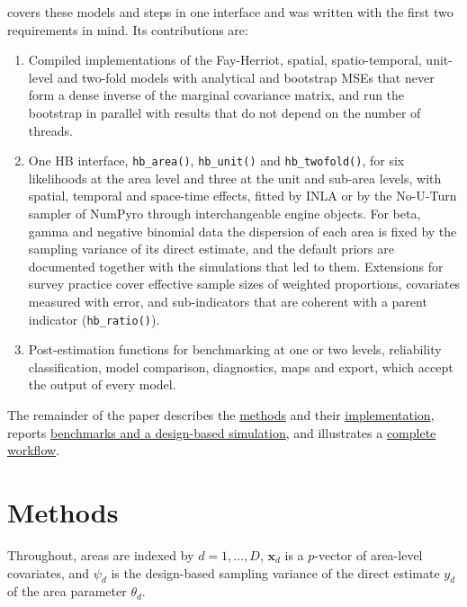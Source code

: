  covers these models and steps in one interface and was written with the first two requirements in mind. Its contributions are:

\begin{enumerate}
\def\labelenumi{\arabic{enumi}.}
\tightlist
\item
  Compiled implementations of the Fay-Herriot, spatial, spatio-temporal, unit-level and two-fold models with analytical and bootstrap MSEs that never form a dense inverse of the marginal covariance matrix, and run the bootstrap in parallel with results that do not depend on the number of threads.
\item
  One HB interface, \texttt{hb\_area()}, \texttt{hb\_unit()} and \texttt{hb\_twofold()}, for six likelihoods at the area level and three at the unit and sub-area levels, with spatial, temporal and space-time effects, fitted by INLA \citep{rue2009approximate} or by the No-U-Turn sampler of NumPyro \citep{hoffman2014no, phan2019composable} through interchangeable engine objects. For beta, gamma and negative binomial data the dispersion of each area is fixed by the sampling variance of its direct estimate, and the default priors are documented together with the simulations that led to them. Extensions for survey practice cover effective sample sizes of weighted proportions, covariates measured with error, and sub-indicators that are coherent with a parent indicator (\texttt{hb\_ratio()}).
\item
  Post-estimation functions for benchmarking at one or two levels, reliability classification, model comparison, diagnostics, maps and export, which accept the output of every model.
\end{enumerate}

The remainder of the paper describes the \hyperref[sec:methods]{methods} and their \hyperref[sec:design]{implementation}, reports \hyperref[sec:simulations]{benchmarks and a design-based simulation}, and illustrates a \hyperref[sec:applications]{complete workflow}.

\section{Methods}\label{sec:methods}

Throughout, areas are indexed by \(d = 1, \dots, D\), \(\boldsymbol{x}_d\) is a \(p\)-vector of area-level covariates, and \(\psi_d\) is the design-based sampling variance of the direct estimate \(y_d\) of the area parameter \(\theta_d\).

